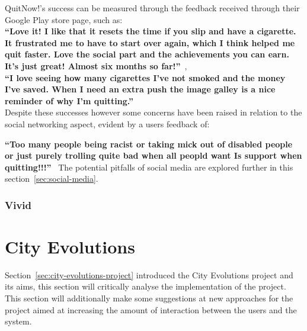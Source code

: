 \documentclass[a4paper,12pt]{article}
\begin{document}
QuitNow!'s success can be measured through the feedback received through their Google Play store page, such as: \\

\indent\textbf{``Love it! I like that it resets the time if you slip and have a cigarette. It frustrated me to have to start over again, which I think helped me quit faster. Love the social part and the achievements you can earn. It's just great! Almost six months so far!''}~\citep{quitnow},\\

\indent\textbf{``I love seeing how many cigarettes I've not smoked and the money I've saved. When I need an extra push the image galley is a nice reminder of why I'm quitting.''}~\citep{quitnow}\\

Despite these successes however some concerns have been raised in relation to the social networking aspect, evident by a users feedback of:\ 

\indent\textbf{``Too many people being racist or taking mick out of disabled people or just purely trolling quite bad when all peopld want Is support when quitting!!!''}~\citep{quitnow}
The potential pitfalls of social media are explored further in this section~\ref{sec:social-media}.

\subsubsection{Vivid}


\newpage
\section{City Evolutions}
Section~\ref{sec:city-evolutions-project} introduced the City Evolutions project and its aims, this section will critically analyse the implementation of the project.
This section will additionally make some suggestions at new approaches for the project aimed at increasing the amount of interaction between the users and the system.
\end{document}
